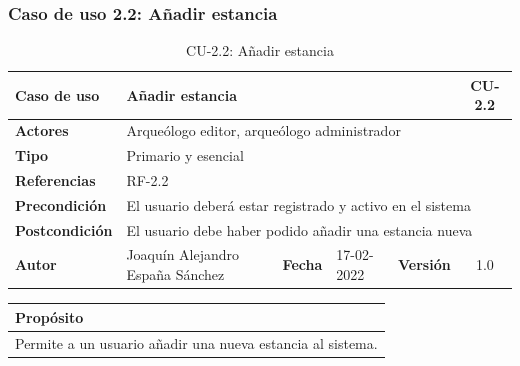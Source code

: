 \subsubsection{Caso de uso 2.2: Añadir estancia}

    \begin{table}[H]
    \begin{center}
        \begin{adjustbox}{width=\textwidth}
        \begin{tabular}{ | l | l | l | l | c | c | } 
            \hline
            \textbf{Caso de uso} & \multicolumn{4}{l|}{Añadir estancia} & \cellcolor{gray!50} \textbf{CU-2.2}\\
            \hline
            \textbf{Actores} & \multicolumn{5}{p{0.9\linewidth}|}{Arqueólogo editor, arqueólogo administrador} \\
            \hline
            \textbf{Tipo} & \multicolumn{5}{l|}{Primario y esencial} \\
            \hline
            \textbf{Referencias} & \multicolumn{3}{l|}{RF-2.2} & \multicolumn{2}{l|}{ }\\
            \hline
            \textbf{Precondición} & \multicolumn{5}{l|}{El usuario deberá estar registrado y activo en el sistema} \\
            \hline
            \textbf{Postcondición} & \multicolumn{5}{l|}{El usuario debe haber podido añadir una estancia nueva} \\
            \hline
            \textbf{Autor} & \multicolumn{1}{p{0.25\linewidth}|}{Joaquín Alejandro España Sánchez} & \textbf{Fecha} & 
            17-02-2022     & \textbf{Versión}                                                      & 1.0\\
            \hline
        \end{tabular}
        \end{adjustbox}
        \caption{CU-2.2: Añadir estancia}
        \label{tab:add-room}
    \end{center}
    \end{table}

    \begin{table}[H]
        \centering
        \begin{tabularx}{\textwidth}{@{} |L |@{}} \hline
            \textbf{Propósito} \\
            \hline
            Permite a un usuario añadir una nueva estancia al sistema. \\
            \hline
        \end{tabularx}
    \end{table}

